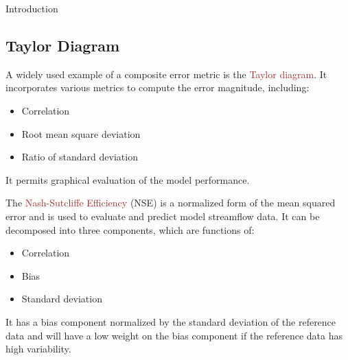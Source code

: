 \documentclass[xcolor={dvipsnames}]{beamer}
\begin{document}
\begin{frame}{Introduction}

\subsection*{Taylor Diagram}

A widely used example of a composite error metric is the \textcolor{brown}{Taylor diagram}. It incorporates various metrics to compute the error magnitude, including:
\begin{itemize}
    \item Correlation
    \item Root mean square deviation
    \item Ratio of standard deviation
\end{itemize}
It permits graphical evaluation of the model performance. \newline

\pause

The \textcolor{brown}{Nash-Sutcliffe Efficiency} (NSE) is a normalized form of the mean squared error and is used to evaluate and predict model streamflow data. It can be decomposed into three components, which are functions of:
\begin{itemize}
    \item Correlation
    \item Bias
    \item Standard deviation
\end{itemize}

It has a bias component normalized by the standard deviation of the reference data and will have a low weight on the bias component if the reference data has high variability.

\end{frame}
\end{document}
